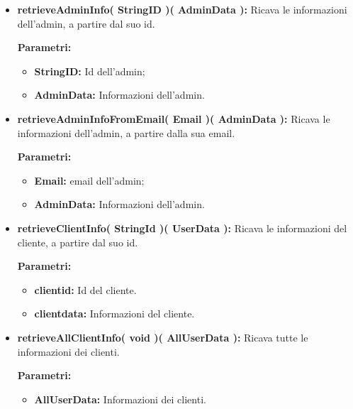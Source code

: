 \begin{itemize}
\begin{itemize}
			\item \textbf{retrieveAdminInfo( StringID )( AdminData ):} Ricava le informazioni dell'admin, a partire dal suo id.
				\begin{description}
    				\item[\textbf{Parametri:}]
				\end{description}
				\begin{itemize}
					\item \textbf{StringID:} Id dell'admin;
					\item \textbf{AdminData:} Informazioni dell'admin.
				\end{itemize}
			
			\item \textbf{retrieveAdminInfoFromEmail( Email )( AdminData ):} Ricava le informazioni dell'admin, a partire dalla sua email.
				\begin{description}
					\item[\textbf{Parametri:}]
				\end{description}
				\begin{itemize}
					\item \textbf{Email:} email dell'admin;
					\item \textbf{AdminData:} Informazioni dell'admin.
				\end{itemize}	
				
			\item \textbf{retrieveClientInfo( StringId )( UserData ):} Ricava le informazioni del cliente, a partire dal suo id.
				\begin{description}
    				\item[\textbf{Parametri:}]
				\end{description}
				\begin{itemize}
					\item \textbf{clientid:} Id del cliente.
					\item \textbf{clientdata:} Informazioni del cliente.
				\end{itemize}
			
			\item \textbf{retrieveAllClientInfo( void )( AllUserData ):} Ricava tutte le informazioni dei clienti.
				\begin{description}
					\item[\textbf{Parametri:}]
				\end{description}
				\begin{itemize}
					\item \textbf{AllUserData:} Informazioni dei clienti.
				\end{itemize}
			

\end{itemize}
\end{itemize}
